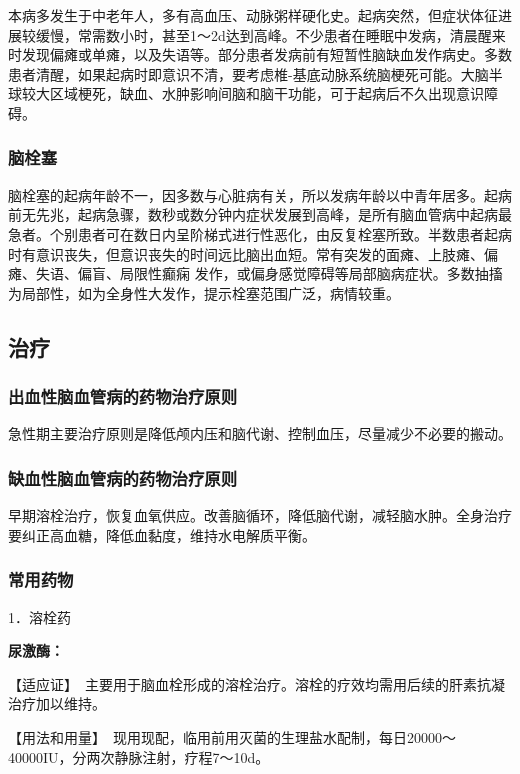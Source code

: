 本病多发生于中老年人，多有高血压、动脉粥样硬化史。起病突然，但症状体征进展较缓慢，常需数小时，甚至1～2d达到高峰。不少患者在睡眠中发病，清晨醒来时发现偏瘫或单瘫，以及失语等。部分患者发病前有短暂性脑缺血发作病史。多数患者清醒，如果起病时即意识不清，要考虑椎-基底动脉系统脑梗死可能。大脑半球较大区域梗死，缺血、水肿影响间脑和脑干功能，可于起病后不久出现意识障碍。

\subsubsection{脑栓塞}

脑栓塞的起病年龄不一，因多数与心脏病有关，所以发病年龄以中青年居多。起病前无先兆，起病急骤，数秒或数分钟内症状发展到高峰，是所有脑血管病中起病最急者。个别患者可在数日内呈阶梯式进行性恶化，由反复栓塞所致。半数患者起病时有意识丧失，但意识丧失的时间远比脑出血短。常有突发的面瘫、上肢瘫、偏瘫、失语、偏盲、局限性癫痫
发作，或偏身感觉障碍等局部脑病症状。多数抽搐为局部性，如为全身性大发作，提示栓塞范围广泛，病情较重。

\subsection{治疗}

\subsubsection{出血性脑血管病的药物治疗原则}

急性期主要治疗原则是降低颅内压和脑代谢、控制血压，尽量减少不必要的搬动。

\subsubsection{缺血性脑血管病的药物治疗原则}

早期溶栓治疗，恢复血氧供应。改善脑循环，降低脑代谢，减轻脑水肿。全身治疗要纠正高血糖，降低血黏度，维持水电解质平衡。

\subsubsection{常用药物}

1．溶栓药

\textbf{尿激酶：}

【适应证】　主要用于脑血栓形成的溶栓治疗。溶栓的疗效均需用后续的肝素抗凝治疗加以维持。

【用法和用量】　现用现配，临用前用灭菌的生理盐水配制，每日20000～40000IU，分两次静脉注射，疗程7～10d。

